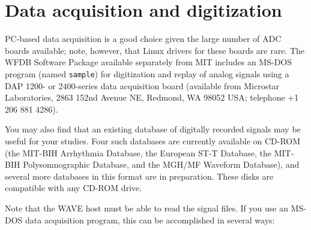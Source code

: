 \documentclass[twoside]{book}
\newcommand{\WAVE}{{\sf WAVE}\xspace}
\begin{document}
\section{Data acquisition and digitization}
\label{sec:adc-boards}
PC-based data acquisition is a good choice given the large number of ADC boards
available;  note, however, that Linux drivers for these boards are rare.
The WFDB Software Package available separately from MIT includes an MS-DOS
program (named {\tt sample}) for digitization and replay of analog signals
using a DAP 1200- or 2400-series data acquisition board (available from
Microstar Laboratories, 2863 152nd Avenue NE, Redmond, WA 98052 USA; telephone
+1 206 881 4286).

You may also find that an existing database of digitally recorded signals may
be useful for your studies.  Four such databases are currently available on
CD-ROM (the MIT-BIH Arrhythmia Database, the European ST-T Database, the
MIT-BIH Polysomnographic Database, and the MGH/MF Waveform Database), and
several more databases in this format are in preparation.  These disks are
compatible with any CD-ROM drive.

Note that the \WAVE{} host
\index{WAVE host@\WAVE{} host}
must be able
to read the signal files.  If you use an MS-DOS data acquisition
program, this can be accomplished in several ways:
\end{document}

